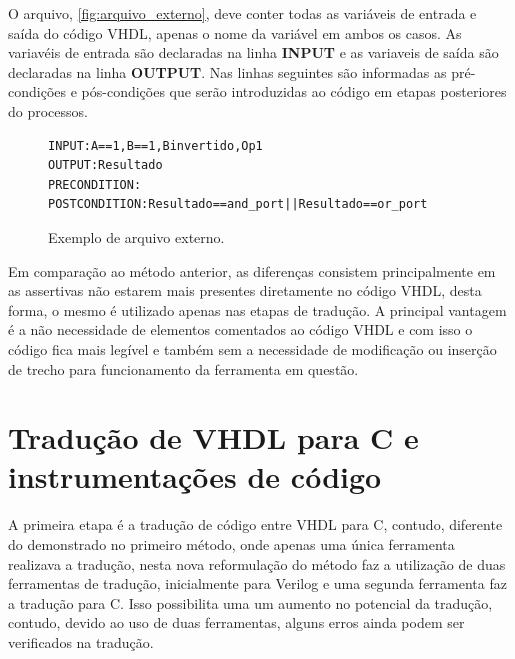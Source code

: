 \par
O arquivo, \autoref{fig:arquivo_externo}, deve conter todas as variáveis de entrada e saída do código VHDL, apenas o nome da variável em ambos os casos. As variavéis de entrada são declaradas na linha \textbf{INPUT} e as variaveis de saída são declaradas na linha \textbf{OUTPUT}. Nas linhas seguintes são informadas as pré-condições e pós-condições que serão introduzidas ao código em etapas posteriores do processos.

\begin{figure}[H]
\caption{\label{fig:arquivo_externo} Exemplo de arquivo externo.}
	\begin{center}
    \begin{minipage}{0.8\textwidth}
    \begin{lstlisting}       
INPUT:A==1,B==1,Binvertido,Op1
OUTPUT:Resultado
PRECONDITION:
POSTCONDITION:Resultado==and_port||Resultado==or_port
    \end{lstlisting}
    \end{minipage}
	\end{center}
\end{figure}

\par
Em comparação ao método anterior, as diferenças consistem principalmente em as assertivas não estarem mais presentes diretamente no código VHDL, desta forma, o mesmo é utilizado apenas nas etapas de tradução. A principal vantagem é a não necessidade de elementos comentados ao código VHDL e com isso o código fica mais legível e também sem a necessidade de modificação ou inserção de trecho para funcionamento da ferramenta em questão.

\section{\label{cap:traducao}Tradução de VHDL para C e instrumentações de código}

\par
A primeira etapa é a tradução de código entre VHDL para C, contudo, diferente do demonstrado no primeiro método, onde apenas uma única ferramenta realizava a tradução, nesta nova reformulação do método faz a utilização de duas ferramentas de tradução, inicialmente para Verilog e uma segunda ferramenta faz a tradução para C. Isso possibilita uma um aumento no potencial da tradução, contudo, devido ao uso de duas ferramentas, alguns erros ainda podem ser verificados na tradução.

